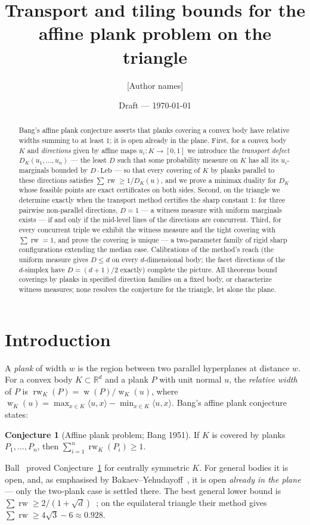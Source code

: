 \documentclass[11pt,reqno]{amsart}
\title{Transport and tiling bounds for the affine plank problem on the triangle}
\author{[Author names]}
\date{Draft --- \today}
\theoremstyle{plain}
\theoremstyle{definition}
\newtheorem{conjecture}[theorem]{Conjecture}
\theoremstyle{remark}
\newcommand{\rw}{\operatorname{rw}}
\newcommand{\R}{\mathbb{R}}
\DeclareMathOperator{\wid}{w}
\begin{document}
\begin{abstract}
Bang's affine plank conjecture asserts that planks covering a convex body have
relative widths summing to at least $1$; it is open already in the plane.
First, for a convex body $K$ and \emph{directions} given by affine maps
$u_i:K\to[0,1]$ we introduce the \emph{transport defect}
$D_K(u_1,\dots,u_n)$ --- the least $D$ such that some probability measure on
$K$ has all its $u_i$-marginals bounded by $D\cdot\mathrm{Leb}$ --- so that
every covering of $K$ by planks parallel to these directions satisfies
$\sum\rw\ge1/D_K(u)$, and we prove a minimax duality for $D_K$ whose feasible
points are exact certificates on both sides. Second, on the triangle we
determine exactly when the transport method certifies the sharp constant $1$:
for three pairwise non-parallel directions, $D=1$ --- a witness measure with
uniform marginals exists --- if and only if the mid-level lines of the
directions are concurrent. Third, for every concurrent triple we exhibit the
witness measure and the tight covering with $\sum\rw=1$, and prove the
covering is unique --- a two-parameter family of rigid sharp configurations
extending the median case. Calibrations of the method's reach (the uniform
measure gives $D\le d$ on every $d$-dimensional body; the facet directions of
the $d$-simplex have $D=(d+1)/2$ exactly) complete the picture. All theorems
bound coverings by planks in specified direction families on a fixed body, or
characterize witness measures; none resolves the conjecture for the triangle,
let alone the plane.
\end{abstract}
\maketitle

\section{Introduction}\label{sec:intro}

A \emph{plank} of width $w$ is the region between two parallel hyperplanes at
distance $w$. For a convex body $K\subset\R^d$ and a plank $P$ with unit normal $u$,
the \emph{relative width} of $P$ is $\rw_K(P)=\wid(P)/\wid_K(u)$, where
$\wid_K(u)=\max_{x\in K}\langle u,x\rangle-\min_{x\in K}\langle u,x\rangle$. Bang's
affine plank conjecture~\cite{Bang51,Ambrus} states:
\begin{conjecture}[Affine plank problem; Bang 1951]\label{conj:bang}
If $K$ is covered by planks $P_1,\dots,P_n$, then $\sum_{i=1}^n \rw_K(P_i)\ge 1$.
\end{conjecture}
Ball~\cite{Ball91} proved Conjecture~\ref{conj:bang} for centrally symmetric $K$.
For general bodies it is open, and, as emphasised by Bakaev--Yehudayoff~\cite{BY26},
it is open \emph{already in the plane} --- only the two-plank case is settled there.
The best general lower bound is
$\sum\rw\ge 2/(1+\sqrt d)$~\cite{BY26}; on the equilateral triangle their method
gives $\sum\rw\ge 4\sqrt3-6\approx0.928$.
\end{document}
